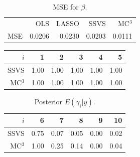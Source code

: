 \documentclass[mathserif, 11pt, t]{beamer}
\begin{document}
\begin{frame}

\begin{table}
\centering
\begin{tabular}{lrrrr}
\hline\hline
    & OLS    & LASSO  & SSVS   & MC$^3$ \\
MSE & 0.0206 & 0.0230 & 0.0203 & 0.0111 \\
\hline\hline
\end{tabular}
\caption{MSE for $\beta$.}
\end{table}

\begin{table}[ht]
\centering
\begin{tabular}{rrrrrr}
  \hline\hline
$i$ & 1 & 2 & 3 & 4 & 5  \\ 
  \hline
SSVS   & 1.00 & 1.00 & 1.00 & 1.00 & 1.00  \\ 
MC$^3$ & 1.00 & 1.00 & 1.00 & 1.00 & 1.00  \\ 
   \hline\hline
\end{tabular}
\end{table}
\begin{table}[ht]
\centering
\begin{tabular}{rrrrrr}
  \hline\hline
$i$ & 6 & 7 & 8 & 9 & 10 \\ 
  \hline
SSVS   &  0.75 & 0.07 & 0.05 & 0.00 & 0.02 \\ 
MC$^3$ &  1.00 & 0.25 & 0.14 & 0.00 & 0.04 \\ 
   \hline\hline
\end{tabular}
\caption{Posterior $E(\gamma_i|y)$.}
\end{table}



\end{frame}
\end{document}
